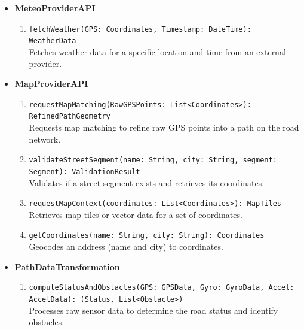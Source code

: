 \begin{itemize}
\begin{enumerate}
        \end{enumerate}
    \item \textbf{MeteoProviderAPI}
        \begin{enumerate}
            \item \texttt{fetchWeather(GPS: Coordinates, Timestamp: DateTime): WeatherData} \\ Fetches weather data for a specific location and time from an external provider.
        \end{enumerate}
    \item \textbf{MapProviderAPI}
        \begin{enumerate}
            \item \texttt{requestMapMatching(RawGPSPoints: List<Coordinates>): RefinedPathGeometry} \\ Requests map matching to refine raw GPS points into a path on the road network.
            \item \texttt{validateStreetSegment(name: String, city: String, segment: Segment): ValidationResult} \\ Validates if a street segment exists and retrieves its coordinates.
            \item \texttt{requestMapContext(coordinates: List<Coordinates>): MapTiles} \\ Retrieves map tiles or vector data for a set of coordinates.
            \item \texttt{getCoordinates(name: String, city: String): Coordinates} \\ Geocodes an address (name and city) to coordinates.
        \end{enumerate}
    \item \textbf{PathDataTransformation}
        \begin{enumerate}
            \item \texttt{computeStatusAndObstacles(GPS: GPSData, Gyro: GyroData, Accel: AccelData): (Status, List<Obstacle>)} \\ Processes raw sensor data to determine the road status and identify obstacles.
        \end{enumerate}
\end{itemize}


